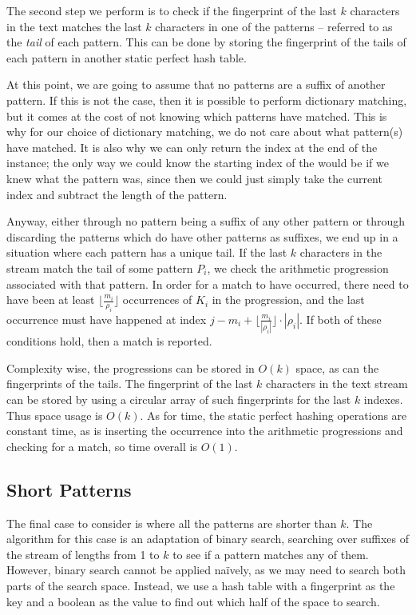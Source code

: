 \documentclass[ %
                    author={Dominic Joseph Moylett},
                    degree={MEng},
                     title={Dictionary Matching with Fingerprints},
                  subtitle={An Empirical Analysis},
                      type={Research},
                      year={2014} ]{dissertation}
\begin{document}
The second step we perform is to check if the fingerprint of the last $k$ characters in the text matches the last $k$ characters in one of the patterns -- referred to as the \textit{tail} of each pattern. This can be done by storing the fingerprint of the tails of each pattern in another static perfect hash table.

At this point, we are going to assume that no patterns are a suffix of another pattern. If this is not the case, then it is possible to perform dictionary matching, but it comes at the cost of not knowing which patterns have matched. This is why for our choice of dictionary matching, we do not care about what pattern(s) have matched. It is also why we can only return the index at the end of the instance; the only way we could know the starting index of the would be if we knew what the pattern was, since then we could just simply take the current index and subtract the length of the pattern.

Anyway, either through no pattern being a suffix of any other pattern or through discarding the patterns which do have other patterns as suffixes, we end up in a situation where each pattern has a unique tail. If the last $k$ characters in the stream match the tail of some pattern $P_i$, we check the arithmetic progression associated with that pattern. In order for a match to have occurred, there need to have been at least $\lfloor\frac{m_i}{\rho_i}\rfloor$ occurrences of $K_i$ in the progression, and the last occurrence must have happened at index $j - m_i + \lfloor\frac{m_i}{|\rho_i|}\rfloor\cdot|\rho_i|$. If both of these conditions hold, then a match is reported.

Complexity wise, the progressions can be stored in $O(k)$ space, as can the fingerprints of the tails. The fingerprint of the last $k$ characters in the text stream can be stored by using a circular array of such fingerprints for the last $k$ indexes. Thus space usage is $O(k)$. As for time, the static perfect hashing operations are constant time, as is inserting the occurrence into the arithmetic progressions and checking for a match, so time overall is $O(1)$.

\subsection{Short Patterns}
\label{ssec:short-theory}

The final case to consider is where all the patterns are shorter than $k$. The algorithm for this case is an adaptation of binary search, searching over suffixes of the stream of lengths from 1 to $k$ to see if a pattern matches any of them. However, binary search cannot be applied na\"{i}vely, as we may need to search both parts of the search space. Instead, we use a hash table with a fingerprint as the key and a boolean as the value to find out which half of the space to search.
\end{document}
